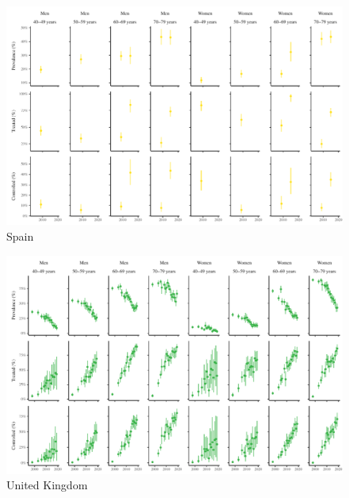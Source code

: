 \documentclass[12pt]{article}
\begin{document}
\begin{appendix}
\begin{refsection}
\begin{landscape}
        \begin{figure}[H]
            \centering
            \includegraphics[width=\linewidth]{../3_figures/countries/fig_spain.pdf}
            \caption{Spain}
            \label{fig:spain}
        \end{figure}

        \begin{figure}[H]
            \centering
            \includegraphics[width=\linewidth]{../3_figures/countries/fig_united kingdom.pdf}
            \caption{United Kingdom}
            \label{fig:uk}
        \end{figure}


\end{landscape}
\end{refsection}
\end{appendix}
\end{document}
